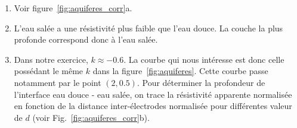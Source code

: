 \begin{corrige}
	\begin{enumerate}
		\item Voir figure~\ref{fig:aquiferes_corr}a.
		\item {} L'eau salée a une résistivité plus faible
		  que l'eau douce. La couche la plus profonde correspond donc à l'eau salée.
		\item Dans notre exercice, $k \approx -0.6$. La courbe qui nous intéresse
		  est donc celle possédant le même $k$ dans la 
		  figure~\ref{fig:aquiferes}. Cette courbe passe notamment 
		  par le point $(2, 0.5)$. Pour déterminer la profondeur de 
		  l'interface eau douce - eau salée, on trace la résistivité apparente
		  normalisée en fonction de la distance inter-électrodes normalisée
		  pour différentes valeur de $d$ (voir Fig.~\ref{fig:aquiferes_corr}b).
	\end{enumerate}
\end{corrige}

